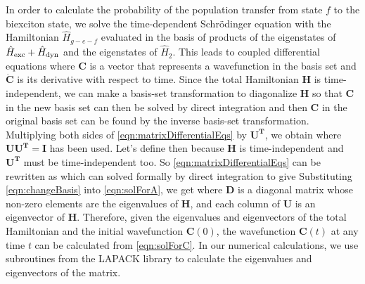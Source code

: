 In order to calculate the probability of the population transfer from state $f$ to the biexciton state, we solve the
 time-dependent Schr\"{o}dinger equation with the Hamiltonian $\hat{H}_{g-e-f}$ evaluated in the basis of products of
 the eigenstates of $\hat{H}_{\rm exc} + \hat{H}_{\rm dyn}$ and the eigenstates of $\hat{H}_2$. This leads to coupled
 differential equations
where $\mathbf{C}$ is a vector that represents a wavefunction in the basis set and $\mathbf{\dot{C}}$ is its derivative
with respect to time. Since the total Hamiltonian $\mathbf{H}$ is time-independent, we can make a basis-set 
transformation to diagonalize $\mathbf{H}$
 so that $\mathbf{C}$ in the new basis set can then be solved by direct
 integration and then $\mathbf{C}$ in the original basis set can be found by the inverse basis-set transformation. 
Multiplying both sides of \autoref{eqn:matrixDifferentialEqs}  by $\mathbf{U^{T}}$, we obtain
where $ \mathbf{U} \mathbf{U^{T}} = \mathbf{I}$ has been used. Let's define
then
because $\mathbf{H}$ is time-independent and $\mathbf{U^{T}}$ must be time-independent too.  
So \autoref{eqn:matrixDifferentialEqs} can be rewritten as
which can solved formally by direct integration to give
Substituting \autoref{eqn:changeBasis} into \autoref{eqn:solForA}, we get
where $\mathbf{D}$ is a diagonal matrix whose non-zero elements are the eigenvalues of $\mathbf{H}$, and each
column of $\mathbf{U}$ is an eigenvector of $\mathbf{H}$. Therefore, given the eigenvalues and eigenvectors of the
total Hamiltonian and the initial wavefunction $\mathbf{C}(0)$, the wavefunction $\mathbf{C}(t)$ at any time $t$ can
be calculated from \autoref{eqn:solForC}. In our numerical calculations, we use subroutines from the LAPACK library\cite{lapack}
to calculate the eigenvalues and eigenvectors of the matrix. 

